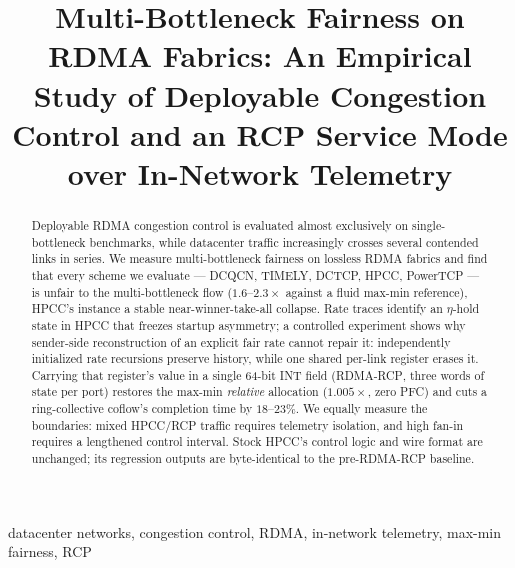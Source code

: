 \documentclass[conference]{IEEEtran}
\newcommand{\hpccfs}{\textsc{RDMA-RCP}\xspace}
\begin{document}
\title{Multi-Bottleneck Fairness on RDMA Fabrics: An Empirical Study of Deployable
Congestion Control and an RCP Service Mode over In-Network Telemetry}

\author{
}

\maketitle

\begin{abstract}
Deployable RDMA congestion control is evaluated almost exclusively on single-bottleneck
benchmarks, while datacenter traffic increasingly crosses several contended links in series.
We measure multi-bottleneck fairness on lossless RDMA fabrics and find that every scheme we
evaluate --- DCQCN, TIMELY, DCTCP, HPCC, PowerTCP --- is unfair to the multi-bottleneck flow
($1.6$--$2.3\times$ against a fluid max-min reference), HPCC's instance a stable
near-winner-take-all collapse. Rate traces identify an $\eta$-hold state in HPCC that freezes startup asymmetry; a
controlled experiment shows why sender-side reconstruction of an explicit fair rate cannot
repair it: independently initialized rate recursions preserve history, while one shared
per-link register erases it. Carrying that register's value in a
single 64-bit INT field (\hpccfs, three words of state per port) restores the max-min
\emph{relative} allocation ($1.005\times$, zero PFC) and cuts a ring-collective coflow's completion time by
$18$--$23\%$. We equally measure the boundaries: mixed HPCC/RCP traffic requires telemetry
isolation, and high fan-in requires a lengthened control interval. Stock HPCC's control
logic and wire format are unchanged; its regression outputs are byte-identical to the
pre-\hpccfs baseline.
\end{abstract}

\begin{IEEEkeywords}
datacenter networks, congestion control, RDMA, in-network telemetry, max-min fairness, RCP
\end{IEEEkeywords}


\end{document}
